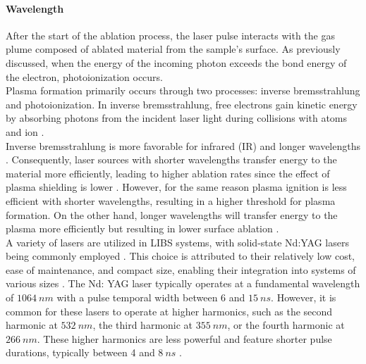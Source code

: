 \paragraph{Wavelength}
\label{par:wavelength_setup_component}
After the start of the ablation process, the laser pulse interacts with the gas plume \cite{fortesLaserinducedBreakdownSpectroscopy2013} composed of ablated material from the sample's surface. As previously discussed, when the energy of the incoming photon exceeds the bond energy of the electron, photoionization occurs.
\\
Plasma formation primarily occurs through two processes: inverse bremsstrahlung and photoionization. In inverse bremsstrahlung, free electrons gain kinetic energy by absorbing photons from the incident laser light during collisions with atoms and ion \cite{moenke-blankenburgDirectSolidSoil1994}.
\\
Inverse bremsstrahlung is more favorable for infrared (IR) and longer wavelengths \cite{cabalinExperimentalDeterminationLaser1998}. Consequently, laser sources with shorter wavelengths transfer energy to the material more efficiently, leading to higher ablation rates since the effect of plasma shielding is lower \cite{russoInfluenceWavelengthFractionation2000}. However, for the same reason plasma ignition is less efficient with shorter wavelengths, resulting in a higher threshold for plasma formation. On the other hand, longer wavelengths will transfer energy to the plasma more efficiently but resulting in lower surface ablation \cite{anabitarteLaserInducedBreakdownSpectroscopy2012}.
\\
A variety of lasers are utilized in LIBS systems, with solid-state Nd:YAG lasers being commonly employed \cite{koechnerSolidStateLaserEngineering2006}. This choice is attributed to their relatively low cost, ease of maintenance, and compact size, enabling their integration into systems of various sizes \cite{anabitarteLaserInducedBreakdownSpectroscopy2012}. The Nd: YAG laser typically operates at a fundamental wavelength of $1064\:nm$ \cite{ApparatusFundamentals2006} with a pulse temporal width between $6$ and $15\:ns$. However, it is common for these lasers to operate at higher harmonics, such as the second harmonic at $532\:nm$, the third harmonic at $355\:nm$, or the fourth harmonic at $266\:nm$. These higher harmonics are less powerful and feature shorter pulse durations, typically between 4 and $8\:ns$ \cite{singhPreface2007}.


